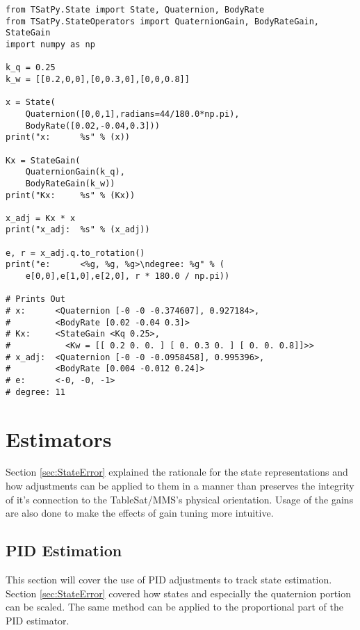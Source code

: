 \begin{singlespace}
  \begin{verbatim}
from TSatPy.State import State, Quaternion, BodyRate
from TSatPy.StateOperators import QuaternionGain, BodyRateGain, StateGain
import numpy as np

k_q = 0.25
k_w = [[0.2,0,0],[0,0.3,0],[0,0,0.8]]

x = State(
    Quaternion([0,0,1],radians=44/180.0*np.pi),
    BodyRate([0.02,-0.04,0.3]))
print("x:      %s" % (x))

Kx = StateGain(
    QuaternionGain(k_q),
    BodyRateGain(k_w))
print("Kx:     %s" % (Kx))

x_adj = Kx * x
print("x_adj:  %s" % (x_adj))

e, r = x_adj.q.to_rotation()
print("e:      <%g, %g, %g>\ndegree: %g" % (
    e[0,0],e[1,0],e[2,0], r * 180.0 / np.pi))

# Prints Out
# x:      <Quaternion [-0 -0 -0.374607], 0.927184>,
#         <BodyRate [0.02 -0.04 0.3]>
# Kx:     <StateGain <Kq 0.25>,
#           <Kw = [[ 0.2 0. 0. ] [ 0. 0.3 0. ] [ 0. 0. 0.8]]>>
# x_adj:  <Quaternion [-0 -0 -0.0958458], 0.995396>,
#         <BodyRate [0.004 -0.012 0.24]>
# e:      <-0, -0, -1>
# degree: 11
  \end{verbatim}
\nocite{minted}
\end{singlespace}


\section{Estimators}
\label{sec:Estimators}

Section \ref{sec:StateError} explained the rationale for the state representations and how adjustments can be applied to them in a manner than preserves the integrity of it's connection to the TableSat/MMS's physical orientation.  Usage of the gains are also done to make the effects of gain tuning more intuitive.

\subsection{PID Estimation}
\label{subsec:PIDEstimation}

This section will cover the use of PID adjustments to track state estimation.  Section \ref{sec:StateError} covered how states and especially the quaternion portion can be scaled.  The same method can be applied to the proportional part of the PID estimator.

